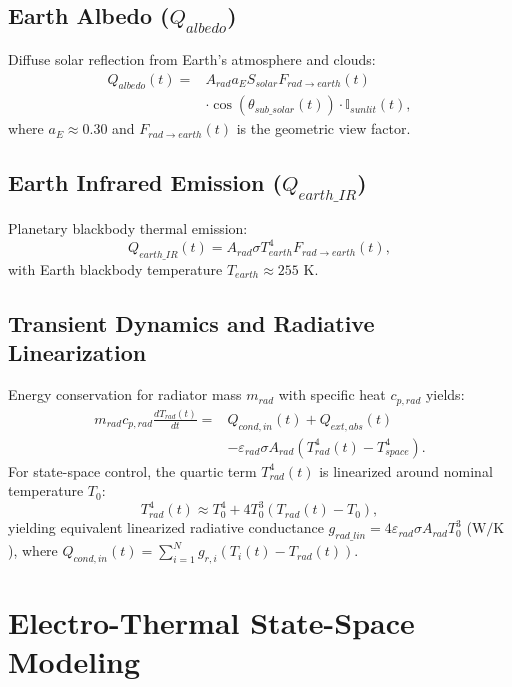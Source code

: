 \documentclass[journal]{IEEEtran}
\begin{document}
\subsection{Earth Albedo ($Q_{albedo}$)}
Diffuse solar reflection from Earth's atmosphere and clouds:
\begin{equation}
\begin{split}
Q_{albedo}(t) = & A_{rad} a_E S_{solar} F_{rad \to earth}(t) \\
& \cdot \cos(\theta_{sub\_solar}(t)) \cdot \mathbb{I}_{sunlit}(t),
\end{split}
\end{equation}
where $a_E \approx 0.30$ and $F_{rad \to earth}(t)$ is the geometric view factor.

\subsection{Earth Infrared Emission ($Q_{earth\_IR}$)}
Planetary blackbody thermal emission:
\begin{equation}
Q_{earth\_IR}(t) = A_{rad} \sigma T_{earth}^4 F_{rad \to earth}(t),
\end{equation}
with Earth blackbody temperature $T_{earth} \approx 255\text{ K}$.

\subsection{Transient Dynamics and Radiative Linearization}
Energy conservation for radiator mass $m_{rad}$ with specific heat $c_{p, rad}$ yields:
\begin{equation}
\begin{split}
m_{rad} c_{p, rad} \frac{d T_{rad}(t)}{dt} = & Q_{cond, in}(t) + Q_{ext,abs}(t) \\
& - \varepsilon_{rad} \sigma A_{rad} \left( T_{rad}^4(t) - T_{space}^4 \right).
\end{split}
\end{equation}
For state-space control, the quartic term $T_{rad}^4(t)$ is linearized around nominal temperature $T_0$:
\begin{equation}
T_{rad}^4(t) \approx T_0^4 + 4 T_0^3 (T_{rad}(t) - T_0),
\end{equation}
yielding equivalent linearized radiative conductance $g_{rad\_lin} = 4 \varepsilon_{rad} \sigma A_{rad} T_0^3$ ($\text{W/K}$), where $Q_{cond, in}(t) = \sum_{i=1}^N g_{r, i} (T_i(t) - T_{rad}(t))$.

\section{Electro-Thermal State-Space Modeling}
\end{document}
